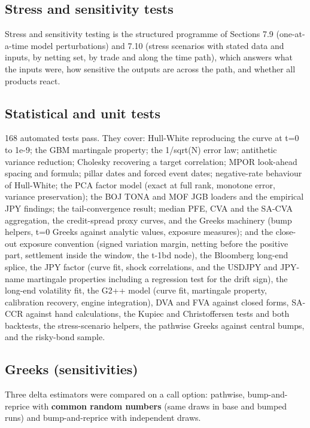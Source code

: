 \documentclass[11pt,letterpaper]{article}
\begin{document}
\subsection{Stress and sensitivity tests}
Stress and sensitivity testing is the structured programme of Sections 7.9 (one-at-a-time model perturbations) and 7.10 (stress scenarios with stated data and inputs, by netting set, by trade and along the time path), which answers what the inputs were, how sensitive the outputs are across the path, and whether all products react.

\subsection{Statistical and unit tests}
168 automated tests pass. They cover: Hull-White reproducing the curve at t=0 to 1e-9; the GBM martingale property; the 1/sqrt(N) error law; antithetic variance reduction; Cholesky recovering a target correlation; MPOR look-ahead spacing and formula; pillar dates and forced event dates; negative-rate behaviour of Hull-White; the PCA factor model (exact at full rank, monotone error, variance preservation); the BOJ TONA and MOF JGB loaders and the empirical JPY findings; the tail-convergence result; median PFE, CVA and the SA-CVA aggregation, the credit-spread proxy curves, and the Greeks machinery (bump helpers, t=0 Greeks against analytic values, exposure measures); and the close-out exposure convention (signed variation margin, netting before the positive part, settlement inside the window, the t-1bd node), the Bloomberg long-end splice, the JPY factor (curve fit, shock correlations, and the USDJPY and JPY-name martingale properties including a regression test for the drift sign), the long-end volatility fit, the G2++ model (curve fit, martingale property, calibration recovery, engine integration), DVA and FVA against closed forms, SA-CCR against hand calculations, the Kupiec and Christoffersen tests and both backtests, the stress-scenario helpers, the pathwise Greeks against central bumps, and the risky-bond sample.

\subsection{Greeks (sensitivities)}
Three delta estimators were compared on a call option: pathwise, bump-and-reprice with \textbf{common random numbers} (same draws in base and bumped runs) and bump-and-reprice with independent draws.
\end{document}

